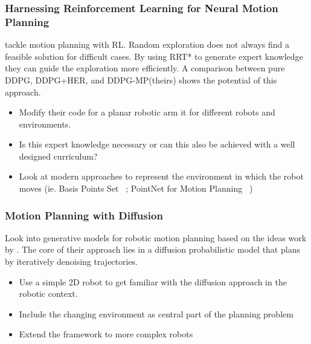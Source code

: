 \documentclass[a4paper]{article}
\begin{document}
\subsubsection{Harnessing Reinforcement Learning for Neural Motion Planning}
 \citet{Jurgenson2019} tackle motion planning with RL.
Random exploration does not always find a feasible solution for difficult cases.
By using RRT* to generate expert knowledge they can guide the exploration more efficiently.
A comparison between pure DDPG, DDPG+HER, and DDPG-MP(theirs) shows the potential of this approach.
\begin{itemize}
  \item Modify their code  for a planar robotic arm it for different robots and environments.
  \item Is this expert knowledge necessary or can this also be achieved with a well designed curriculum?
  \item Look at modern approaches to represent the environment in which the robot moves (ie. Basis Points Set ~\citet{Prokudin2019}; PointNet for Motion Planning ~\citet{Strudel2020})
\end{itemize}

\subsubsection{Motion Planning with Diffusion}
Look into generative models for robotic motion planning based on the ideas work by \citet{Janner2022}.
The core of their approach lies in a diffusion probabilistic model that plans by iteratively denoising trajectories.
\begin{itemize}
  \item Use a simple 2D robot to get familiar with the diffusion approach in the robotic context.
  \item Include the changing environment as central part of the planning problem
  \item Extend the framework to more complex robots
\end{itemize}


%
\end{document}
